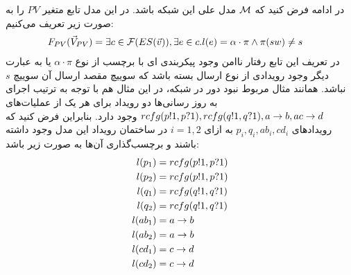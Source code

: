در ادامه فرض کنید که 
$\mathcal{M}$
مدل علی این شبکه باشد.
در این مدل تابع متغیر
$PV$
را به صورت زیر تعریف می‌کنیم:
\begin{align*}
    F_{PV}(\vec V_{PV}) & = \exists c \in \mathcal{F}(ES(\vec v)),
    \exists e \in c. l(e) =  \alpha\cdot\pi \wedge \pi(sw) \neq s
\end{align*}
در تعریف این تابع رفتار ناامن وجود پیکربندی ای با برچسب از نوع 
$\alpha \cdot \pi$
یا به عبارت دیگر وجود رویدادی از نوع ارسال بسته باشد که سوییچ مقصد ارسال آن سوییچ 
$s$
نباشد.
همانند مثال مربوط نبود دور در شبکه، در این مثال هم با توجه به ترتیب اجرای به روز رسانی‌ها دو رویداد برای هر یک از عملیات‌های 
$rcfg(p!1,p?1),rcfg(q!1,q?1),a\rightarrow b,a c\rightarrow d$
وجود دارد. 
بنابراین فرض کنید که رویدادهای
$p_i,q_i,ab_i,cd_i$
به ازای 
$i=1,2$
در ساختمان رویداد این مدل وجود داشته باشند و برچسب‌گذاری آن‌ها به صورت زیر باشد:
\begin{align*}
    l(p_1) & = rcfg(p!1,p?1) \\
    l(p_2) & = rcfg(p!1,p?1) \\
    l(q_1) & = rcfg(q!1,q?1) \\
    l(q_2) & = rcfg(q!1,q?1) \\
    l(ab_1) & = a \rightarrow b \\
    l(ab_2) & = a \rightarrow b \\
    l(cd_1) & = c \rightarrow d \\
    l(cd_2) & = c \rightarrow d \\
\end{align*}

